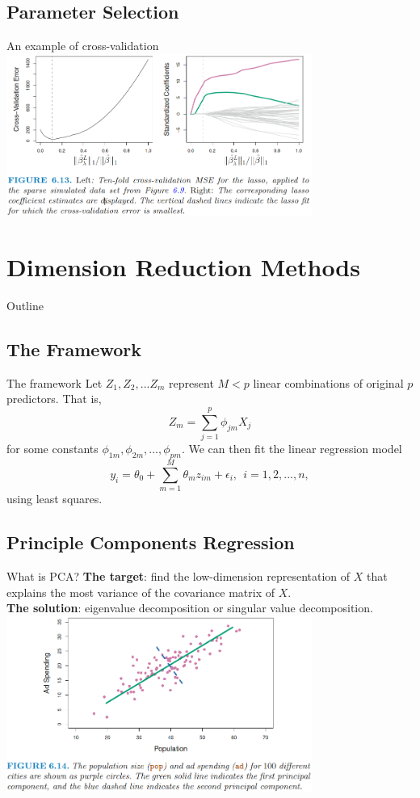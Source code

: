 \documentclass{beamer}
\begin{document}
	\subsection{Parameter Selection}
	\begin{frame}{An example of cross-validation}
		\includegraphics[width=10cm]{figure_6.13.png}
	\end{frame}

	\section{Dimension Reduction Methods}
	\begin{frame}{Outline}
		\tableofcontents[currentsection]
	\end{frame}
	
	\subsection{The Framework}
	\begin{frame}{The framework}
		Let $Z_1,Z_2,...Z_m$ represent $M<p$ linear combinations of original $p$ predictors. That is,
		\[
		Z_m=\sum_{j=1}^{p}\phi_{jm}X_j
		\]
		for some constants $\phi_{1m}, \phi_{2m},...,\phi_{pm}$. We can then fit the linear regression model
		\[
		y_i=\theta_0+\sum_{m=1}^{M}\theta_mz_{im}+\epsilon_i,\ \ i=1,2,...,n,
		\]
		using least squares.
	\end{frame}

	\subsection{Principle Components Regression}
	\begin{frame}{What is PCA?}
		\textbf{The target}: find the low-dimension representation of $X$ that explains the most variance of the covariance matrix of $X$. \\
		\textbf{The solution}: eigenvalue decomposition or singular value decomposition. \\
		\includegraphics[width=10cm]{figure_6.14.png}
	\end{frame}
	
\end{document}
